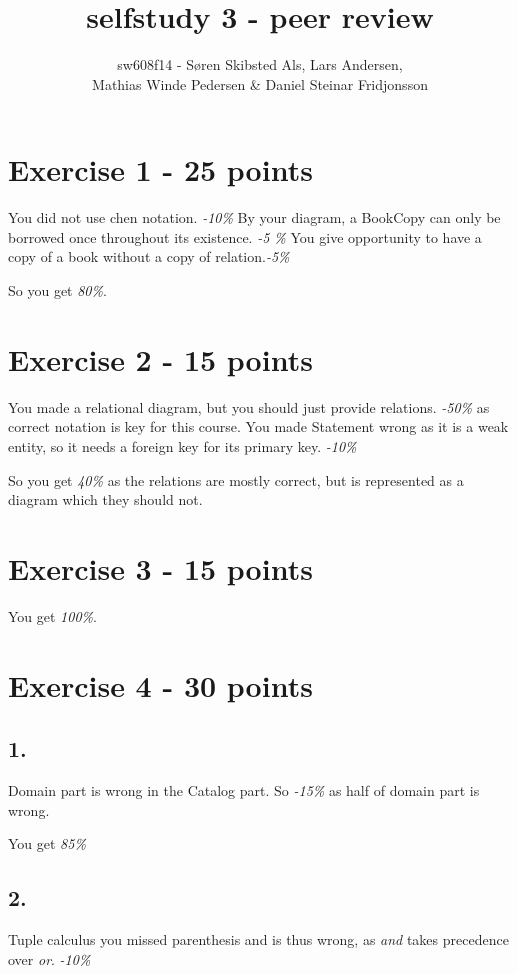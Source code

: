 \documentclass[12pt,a4paper,oneside]{report}
\begin{document}
\title{selfstudy 3 - peer review}
\author{sw608f14 - Søren Skibsted Als, Lars Andersen, \\Mathias Winde Pedersen \& Daniel Steinar Fridjonsson}
\maketitle
\section*{Exercise 1 - 25 points}
You did not use chen notation. \textit{-10\%}
By your diagram, a BookCopy can only be borrowed once throughout its existence. \textit{-5 \%}
You give opportunity to have a copy of a book without a copy of relation.\textit{-5\%}

So you get \textit{80\%}.
\section*{Exercise 2 - 15 points}
You made a relational diagram, but you should just provide relations. \textit{-50\%} as correct notation is key for this course.
You made Statement wrong as it is a weak entity, so it needs a foreign key for its primary key. \textit{-10\%}

So you get \textit{40\%} as the relations are mostly correct, but is represented as a diagram which they should not.

\section*{Exercise 3 - 15 points}
You get \textit{100\%}.

\section*{Exercise 4 - 30 points}
\subsection*{1.}
Domain part is wrong in the Catalog part. So \textit{-15\%} as half of domain part is wrong.

You get \textit{85\%}
\subsection*{2.}
Tuple calculus you missed parenthesis and is thus wrong, as \textit{and} takes precedence over \textit{or}. \textit{-10\%}
\end{document}
